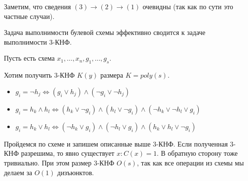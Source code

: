 Заметим, что сведения \( (3) \to (2) \to (1) \) очевидны (так как по сути это частные случаи).

\begin{thrm}{}{}
    Задача выполнимости булевой схемы эффективно сводится к задаче выполнимости 3-КНФ.
\end{thrm}

Пусть есть схема \( x_1, \ldots, x_n, g_1, \ldots, g_s \).

Хотим получить 3-КНФ \( K(y) \) размера \( K = poly(s) \).

\begin{itemize}
    \item
        \(
            g_i = \lnot h_j
            \Leftrightarrow
            (g_i \lor h_j) \land (\lnot g_i \lor \lnot h_j)
        \)
    \item
        \(
            g_i = h_k \land h_l
            \Leftrightarrow
            (h_k \lor \lnot g_i) \land (h_l \lor \lnot g_i) \land (\lnot h_k \lor \lnot h_l \lor g_i)
        \)
    \item
        \(
            g_i = h_k \lor h_l
            \Leftrightarrow
            (\lnot h_k \lor g_i) \land (\lnot h_l \lor g_i) \land (h_k \lor h_l \lor \lnot g_i)
        \)
\end{itemize}

Пройдемся по схеме и запишем описанные выше 3-КНФ.
Если полученная 3-КНФ разрешима, то явно существует \( x : C(x) = 1 \).
В обратную сторону тоже тривиально.
При этом размер 3-КНФ \( O(s) \),
так как все операции из схемы мы делаем за \( O(1) \) дизъюнктов.
